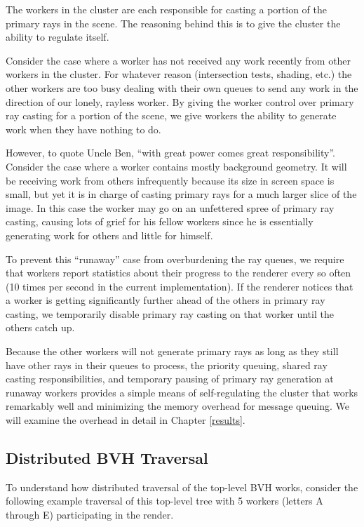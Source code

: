\documentclass[12pt]{ucthesis}
\begin{document}
The workers in the cluster are each responsible for casting a portion of the
primary rays in the scene. The reasoning behind this is to give the cluster
the ability to regulate itself.

Consider the case where a worker has not received any work recently from other
workers in the cluster. For whatever reason (intersection tests, shading, etc.)
the other workers are too busy dealing with their own queues to send any work
in the direction of our lonely, rayless worker. By giving the worker control
over primary ray casting for a portion of the scene, we give workers the ability
to generate work when they have nothing to do.

However, to quote Uncle Ben, ``with great power comes great
responsibility''. Consider the case where a worker contains mostly background
geometry. It will be receiving work from others infrequently because its size
in screen space is small, but yet it is in charge of casting primary rays for
a much larger slice of the image. In this case the worker may go on an
unfettered spree of primary ray casting, causing lots of grief for his fellow
workers since he is essentially generating work for others and little for
himself.

To prevent this ``runaway'' case from overburdening the ray queues, we require
that workers report statistics about their progress to the renderer every so
often (10 times per second in the current implementation). If the renderer
notices that a worker is getting significantly further ahead of the others in
primary ray casting, we temporarily disable primary ray casting on that worker
until the others catch up.

Because the other workers will not generate primary rays as long as they still
have other rays in their queues to process, the priority queuing, shared
ray casting responsibilities, and temporary pausing of primary ray generation at
runaway workers provides a simple means of self-regulating the cluster that
works remarkably well and minimizing the memory overhead for message queuing.
We will examine the overhead in detail in Chapter \ref{results}.

\subsection{Distributed BVH Traversal}
\label{traversal}

To understand how distributed traversal of the top-level BVH works, consider
the following example traversal of this top-level tree with 5 workers (letters
A through E) participating in the render.
\end{document}
